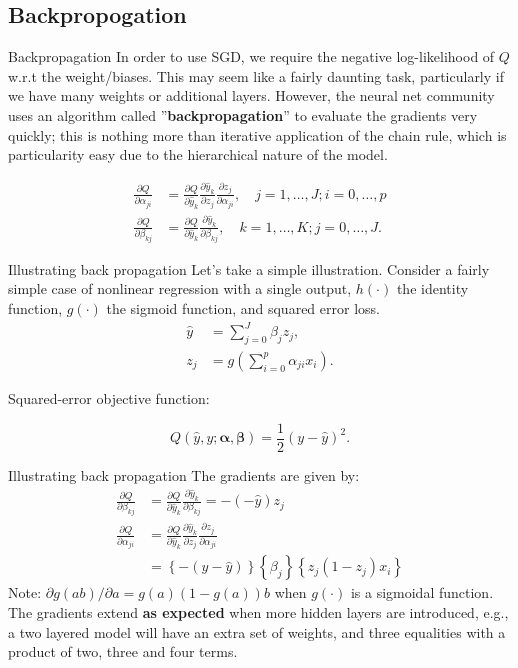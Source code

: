\documentclass{beamer}
\begin{document}
\subsection{Backpropogation}
\begin{frame}{Backpropagation}
In order to use SGD, we require the negative log-likelihood of $Q$ w.r.t the weight/biases. This may seem like a fairly daunting task, particularly if we have many weights or additional layers. However,  the neural net community uses an algorithm called ''\textbf{backpropagation}'' to evaluate the gradients very quickly; this is nothing more than iterative application of the chain rule, which is particularity easy due to the hierarchical nature of the model.

$$
\begin{aligned}
\frac{\partial Q}{\partial \alpha_{j i}} & =\frac{\partial Q}{\partial \hat{y}_{k}} \frac{\partial \hat{y}_{k}}{\partial z_{j}} \frac{\partial z_{j}}{\partial \alpha_{j i}}, \quad j=1, \ldots, J ; i=0, \ldots, p \\
\frac{\partial Q}{\partial \beta_{k j}} & =\frac{\partial Q}{\partial \hat{y}_{k}} \frac{\partial \hat{y}_{k}}{\partial \beta_{k j}}, \quad k=1, \ldots, K ; j=0, \ldots, J.
\end{aligned}
$$
\end{frame}
\begin{frame}{Illustrating back propagation}
Let's take a simple illustration. Consider a fairly simple case of nonlinear regression with a single output, $h(\cdot)$ the identity function, $g(\cdot)$ the sigmoid function, and squared error loss.
\begin{align}
\hat{y} & =\sum_{j=0}^{J} \beta_{j} z_{j}, \\
z_{j} & =g\left(\sum_{i=0}^{p} \alpha_{j i} x_{i}\right).
\end{align}


Squared-error objective function:

$$
Q(\hat{{y}},{y}; \boldsymbol{\alpha}, \boldsymbol{\beta})=\frac{1}{2} \left({y}-\hat{y}\right)^{2}.
$$
\end{frame}
\begin{frame}{Illustrating back propagation}
The gradients are given by:
\begin{align}
 \frac{\partial Q}{\partial \beta_{k j}}&=\frac{\partial Q}{\partial \hat{y}_{k}} \frac{\partial \hat{y}_{k}}{\partial \beta_{k j}}=-\left(-\hat{y}\right) z_{j} \\
\frac{\partial Q}{\partial \alpha_{j i}} & =\frac{\partial Q}{\partial \hat{y}_{k}} \frac{\partial \hat{y}_{k}}{\partial z_{j}} \frac{\partial z_{j}}{\partial \alpha_{j i}}\nonumber \\
& =\left\{-\left(y-\hat{y}\right)\right\}\left\{\beta_{j}\right\}\left\{z_{j}\left(1-z_{j}\right) x_{i}\right\}
\end{align}
Note: $\partial g(a b) / \partial a=g(a)(1-g(a)) b$ when $g(\cdot)$ is a sigmoidal function.\\
The gradients extend \textbf{as expected} when more hidden layers are introduced, e.g., a two layered model will have an extra set of weights, and three equalities with a product of two, three and four terms.
\end{frame}
\end{document}

